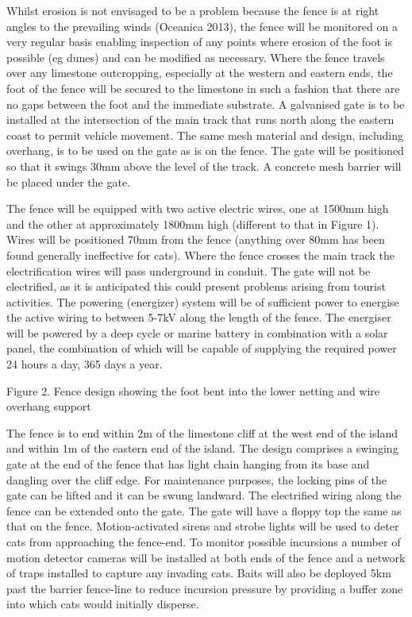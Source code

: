 \documentclass[version=last,
    paper=a4,                               %
    10pt,                                   %
    dvipsnames,
    oneside,                              %
    headings=openany,                       %
    open=any,
    BCOR=7mm,                               %
    DIV=15,     %
]{scrbook}
\begin{document}
Whilst erosion is not envisaged to be a problem because the fence is at
right angles to the prevailing winds (Oceanica 2013), the fence will be
monitored on a very regular basis enabling inspection of any points
where erosion of the foot is possible (eg dunes) and can be modified as
necessary. Where the fence travels over any limestone outcropping,
especially at the western and eastern ends, the foot of the fence will
be secured to the limestone in such a fashion that there are no gaps
between the foot and the immediate substrate. A galvanised gate is to be
installed at the intersection of the main track that runs north along
the eastern coast to permit vehicle movement. The same mesh material and
design, including overhang, is to be used on the gate as is on the
fence. The gate will be positioned so that it swings 30mm above the
level of the track. A concrete mesh barrier will be placed under the
gate.

The fence will be equipped with two active electric wires, one at 1500mm
high and the other at approximately 1800mm high (different to that in
Figure 1). Wires will be positioned 70mm from the fence (anything over
80mm has been found generally ineffective for cats). Where the fence
crosses the main track the electrification wires will pass underground
in conduit. The gate will not be electrified, as it is anticipated this
could present problems arising from tourist activities. The powering
(energizer) system will be of sufficient power to energise the active
wiring to between 5-7kV along the length of the fence. The energiser
will be powered by a deep cycle or marine battery in combination with a
solar panel, the combination of which will be capable of supplying the
required power 24 hours a day, 365 days a year.

Figure 2. Fence design showing the foot bent into the lower netting and
wire overhang support

The fence is to end within 2m of the limestone cliff at the west end of
the island and within 1m of the eastern end of the island. The design
comprises a swinging gate at the end of the fence that has light chain
hanging from its base and dangling over the cliff edge. For maintenance
purposes, the locking pins of the gate can be lifted and it can be swung
landward. The electrified wiring along the fence can be extended onto
the gate. The gate will have a floppy top the same as that on the fence.
Motion-activated sirens and strobe lights will be used to deter cats
from approaching the fence-end. To monitor possible incursions a number
of motion detector cameras will be installed at both ends of the fence
and a network of traps installed to capture any invading cats. Baits
will also be deployed 5km past the barrier fence-line to reduce
incursion pressure by providing a buffer zone into which cats would
initially disperse.
\end{document}

